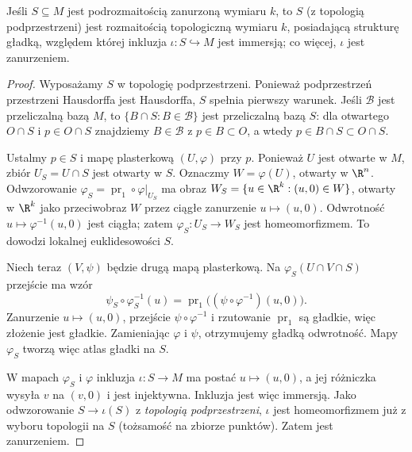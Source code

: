 \begin{stwierdzenie}\label{stw:podrozm-struktura}
Jeśli $S\subseteq M$ jest podrozmaitością zanurzoną wymiaru $k$, to $S$ (z topologią
podprzestrzeni) jest rozmaitością topologiczną wymiaru $k$, posiadającą strukturę gładką,
względem której inkluzja $\iota\colon S\hookrightarrow M$ jest immersją; co więcej, $\iota$
jest zanurzeniem.
\end{stwierdzenie}
\begin{proof}
Wyposażamy $S$ w topologię podprzestrzeni. Ponieważ podprzestrzeń
przestrzeni Hausdorffa jest Hausdorffa, $S$ spełnia pierwszy warunek.
Jeśli $\mathcal B$ jest przeliczalną bazą $M$, to
$\{B\cap S:B\in\mathcal B\}$ jest przeliczalną bazą $S$:
dla otwartego $O\cap S$ i $p\in O\cap S$ znajdziemy
$B\in\mathcal B$ z $p\in B\subset O$, a wtedy
$p\in B\cap S\subset O\cap S$.

Ustalmy $p\in S$ i mapę plasterkową $(U,\varphi)$ przy $p$.
Ponieważ $U$ jest otwarte w $M$, zbiór $U_S=U\cap S$ jest otwarty
w $S$. Oznaczmy $W=\varphi(U)$, otwarty w $\R^n$.
Odwzorowanie $\varphi_S=\operatorname{pr}_1\circ\varphi|_{U_S}$
ma obraz $W_S=\{u\in\R^k:(u,0)\in W\}$, otwarty w $\R^k$ jako
przeciwobraz $W$ przez ciągłe zanurzenie $u\mapsto(u,0)$.
Odwrotność $u\mapsto\varphi^{-1}(u,0)$ jest ciągła; zatem
$\varphi_S:U_S\to W_S$ jest homeomorfizmem. To dowodzi lokalnej
euklidesowości $S$.

Niech teraz $(V,\psi)$ będzie drugą mapą plasterkową. Na
$\varphi_S(U\cap V\cap S)$ przejście ma wzór
\[
\psi_S\circ\varphi_S^{-1}(u)
=\operatorname{pr}_1\bigl((\psi\circ\varphi^{-1})(u,0)\bigr).
\]
Zanurzenie $u\mapsto(u,0)$, przejście $\psi\circ\varphi^{-1}$
i rzutowanie $\operatorname{pr}_1$ są gładkie, więc złożenie jest
gładkie. Zamieniając $\varphi$ i $\psi$, otrzymujemy gładką
odwrotność. Mapy $\varphi_S$ tworzą więc atlas gładki na $S$.

W mapach $\varphi_S$ i $\varphi$ inkluzja $\iota:S\to M$ ma postać
$u\mapsto(u,0)$, a jej różniczka wysyła $v$ na $(v,0)$ i jest
injektywna. Inkluzja jest więc immersją. Jako odwzorowanie
$S\to\iota(S)$ z \emph{topologią podprzestrzeni}, $\iota$ jest
homeomorfizmem już z wyboru topologii na $S$ (tożsamość na
zbiorze punktów). Zatem jest zanurzeniem.
\end{proof}



